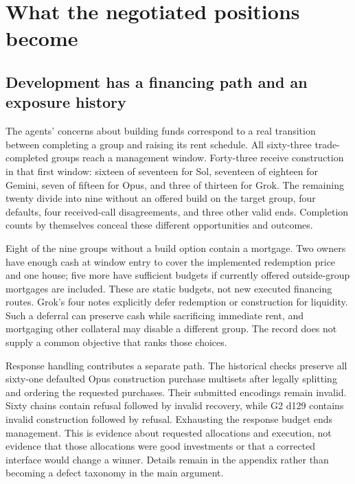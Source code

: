 \section{What the negotiated positions become}
\label{sec:economy}

\subsection{Development has a financing path and an exposure history}

The agents' concerns about building funds correspond to a real transition between completing a group and raising its rent schedule. All sixty-three trade-completed groups reach a management window. Forty-three receive construction in that first window: sixteen of seventeen for Sol, seventeen of eighteen for Gemini, seven of fifteen for Opus, and three of thirteen for Grok. The remaining twenty divide into nine without an offered build on the target group, four defaults, four received-call disagreements, and three other valid ends. Completion counts by themselves conceal these different opportunities and outcomes.

Eight of the nine groups without a build option contain a mortgage. Two owners have enough cash at window entry to cover the implemented redemption price and one house; five more have sufficient budgets if currently offered outside-group mortgages are included. These are static budgets, not new executed financing routes. Grok's four notes explicitly defer redemption or construction for liquidity. Such a deferral can preserve cash while sacrificing immediate rent, and mortgaging other collateral may disable a different group. The record does not supply a common objective that ranks those choices.

Response handling contributes a separate path. The historical checks preserve all sixty-one defaulted Opus construction purchase multisets after legally splitting and ordering the requested purchases. Their submitted encodings remain invalid. Sixty chains contain refusal followed by invalid recovery, while G2 d129 contains invalid construction followed by refusal. Exhausting the response budget ends management. This is evidence about requested allocations and execution, not evidence that those allocations were good investments or that a corrected interface would change a winner. Details remain in the appendix rather than becoming a defect taxonomy in the main argument.

